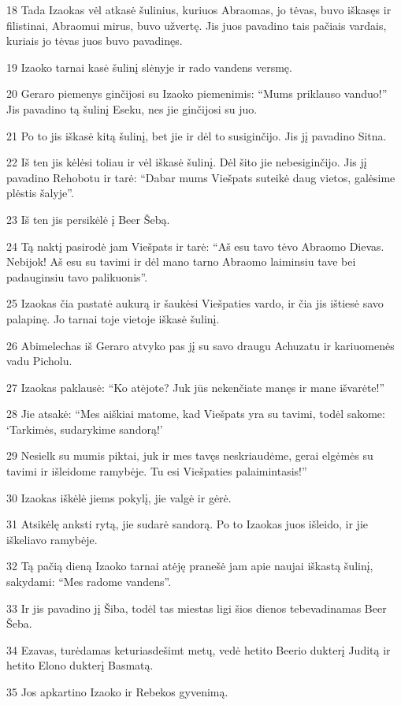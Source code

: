 \par 18 Tada Izaokas vėl atkasė šulinius, kuriuos Abraomas, jo tėvas, buvo iškasęs ir filistinai, Abraomui mirus, buvo užvertę. Jis juos pavadino tais pačiais vardais, kuriais jo tėvas juos buvo pavadinęs. 
\par 19 Izaoko tarnai kasė šulinį slėnyje ir rado vandens versmę. 
\par 20 Geraro piemenys ginčijosi su Izaoko piemenimis: “Mums priklauso vanduo!” Jis pavadino tą šulinį Eseku, nes jie ginčijosi su juo. 
\par 21 Po to jis iškasė kitą šulinį, bet jie ir dėl to susiginčijo. Jis jį pavadino Sitna. 
\par 22 Iš ten jis kėlėsi toliau ir vėl iškasė šulinį. Dėl šito jie nebesiginčijo. Jis jį pavadino Rehobotu ir tarė: “Dabar mums Viešpats suteikė daug vietos, galėsime plėstis šalyje”. 
\par 23 Iš ten jis persikėlė į Beer Šebą. 
\par 24 Tą naktį pasirodė jam Viešpats ir tarė: “Aš esu tavo tėvo Abraomo Dievas. Nebijok! Aš esu su tavimi ir dėl mano tarno Abraomo laiminsiu tave bei padauginsiu tavo palikuonis”. 
\par 25 Izaokas čia pastatė aukurą ir šaukėsi Viešpaties vardo, ir čia jis ištiesė savo palapinę. Jo tarnai toje vietoje iškasė šulinį. 
\par 26 Abimelechas iš Geraro atvyko pas jį su savo draugu Achuzatu ir kariuomenės vadu Picholu. 
\par 27 Izaokas paklausė: “Ko atėjote? Juk jūs nekenčiate manęs ir mane išvarėte!” 
\par 28 Jie atsakė: “Mes aiškiai matome, kad Viešpats yra su tavimi, todėl sakome: ‘Tarkimės, sudarykime sandorą!’ 
\par 29 Nesielk su mumis piktai, juk ir mes tavęs neskriaudėme, gerai elgėmės su tavimi ir išleidome ramybėje. Tu esi Viešpaties palaimintasis!” 
\par 30 Izaokas iškėlė jiems pokylį, jie valgė ir gėrė. 
\par 31 Atsikėlę anksti rytą, jie sudarė sandorą. Po to Izaokas juos išleido, ir jie iškeliavo ramybėje. 
\par 32 Tą pačią dieną Izaoko tarnai atėję pranešė jam apie naujai iškastą šulinį, sakydami: “Mes radome vandens”. 
\par 33 Ir jis pavadino jį Šiba, todėl tas miestas ligi šios dienos tebevadinamas Beer Šeba. 
\par 34 Ezavas, turėdamas keturiasdešimt metų, vedė hetito Beerio dukterį Juditą ir hetito Elono dukterį Basmatą. 
\par 35 Jos apkartino Izaoko ir Rebekos gyvenimą.



